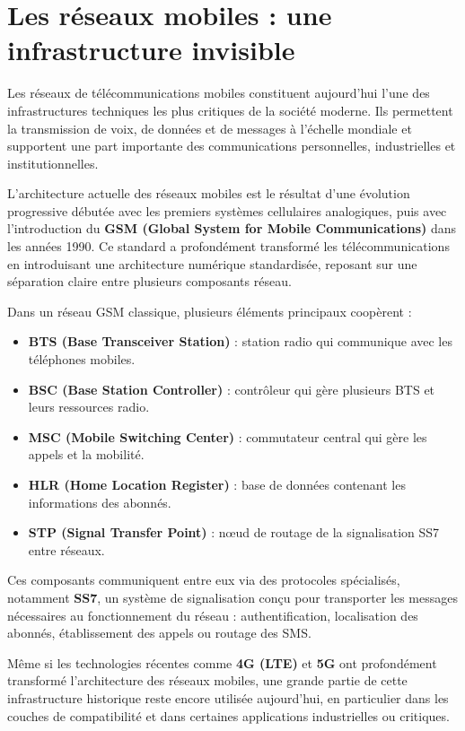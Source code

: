 \documentclass[
]{article}
\author{}
\date{\vspace{-2.5em}}
\providecommand{\tightlist}{%
  \setlength{\itemsep}{0pt}\setlength{\parskip}{0pt}}
\begin{document}
\section{Les réseaux mobiles : une infrastructure
invisible}\label{les-ruxe9seaux-mobiles-une-infrastructure-invisible}

Les réseaux de télécommunications mobiles constituent aujourd'hui l'une
des infrastructures techniques les plus critiques de la société moderne.
Ils permettent la transmission de voix, de données et de messages à
l'échelle mondiale et supportent une part importante des communications
personnelles, industrielles et institutionnelles.

L'architecture actuelle des réseaux mobiles est le résultat d'une
évolution progressive débutée avec les premiers systèmes cellulaires
analogiques, puis avec l'introduction du \textbf{GSM (Global System for
Mobile Communications)} dans les années 1990. Ce standard a profondément
transformé les télécommunications en introduisant une architecture
numérique standardisée, reposant sur une séparation claire entre
plusieurs composants réseau.

Dans un réseau GSM classique, plusieurs éléments principaux coopèrent :

\begin{itemize}
\tightlist
\item
  \textbf{BTS (Base Transceiver Station)} : station radio qui communique
  avec les téléphones mobiles.
\item
  \textbf{BSC (Base Station Controller)} : contrôleur qui gère plusieurs
  BTS et leurs ressources radio.
\item
  \textbf{MSC (Mobile Switching Center)} : commutateur central qui gère
  les appels et la mobilité.
\item
  \textbf{HLR (Home Location Register)} : base de données contenant les
  informations des abonnés.
\item
  \textbf{STP (Signal Transfer Point)} : nœud de routage de la
  signalisation SS7 entre réseaux.
\end{itemize}

Ces composants communiquent entre eux via des protocoles spécialisés,
notamment \textbf{SS7}, un système de signalisation conçu pour
transporter les messages nécessaires au fonctionnement du réseau :
authentification, localisation des abonnés, établissement des appels ou
routage des SMS.

Même si les technologies récentes comme \textbf{4G (LTE)} et \textbf{5G}
ont profondément transformé l'architecture des réseaux mobiles, une
grande partie de cette infrastructure historique reste encore utilisée
aujourd'hui, en particulier dans les couches de compatibilité et dans
certaines applications industrielles ou critiques.
\end{document}
